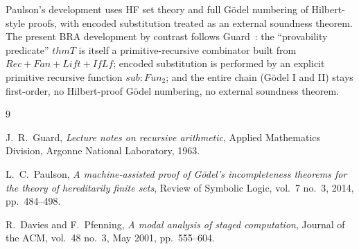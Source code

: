 \documentclass[11pt]{article}
\begin{document}
Paulson's development uses HF set theory and full G\"odel numbering of
Hilbert-style proofs, with encoded substitution treated as an external
soundness theorem.  The present BRA development by contrast follows
Guard~\cite{guard1963}: the ``provability predicate''
$\mathit{thmT}$ is itself a primitive-recursive combinator built from
$\mathit{Rec} + \mathit{Fan} + \mathit{Lift} + \mathit{IfLf}$; encoded
substitution is performed by an explicit primitive recursive function
$\mathit{sub} : \mathit{Fun}_2$; and the entire chain (G\"odel I and
II) stays first-order, no Hilbert-proof G\"odel numbering, no external
soundness theorem.

\begin{thebibliography}{9}

J.~R.~Guard,
\newblock \emph{Lecture notes on recursive arithmetic},
\newblock Applied Mathematics Division, Argonne National Laboratory, 1963.

L.~C.~Paulson,
\newblock \emph{A machine-assisted proof of G\"odel's incompleteness theorems for the theory of hereditarily finite sets},
\newblock Review of Symbolic Logic, vol.~7 no.~3, 2014, pp.~484--498.

R.~Davies and F.~Pfenning,
\newblock \emph{A modal analysis of staged computation},
\newblock Journal of the ACM, vol.~48 no.~3, May 2001, pp.~555--604.

\end{thebibliography}
\end{document}
